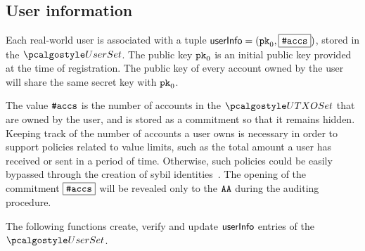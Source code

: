 \subsection{User information}
Each real-world user is associated with a tuple $\userinfo=(\inpk,\comm{\numaccs})$, stored in the $\usersset$.
The public key $\inpk$ is an initial public key provided at the time of registration. 
The public key of every account owned by the user will share the same secret key with $\inpk$.

The value $\numaccs$ is the number of accounts in the $\utxoset$ that are owned by the user, and is stored as a commitment so that it remains hidden. 
Keeping track of the number of accounts a user owns is necessary in order to support  policies related to value limits, such as the total amount a user has received or sent in a period of time. Otherwise, such policies could be easily bypassed through the creation of sybil identities~\cite{SokAuditability}.
 The opening of the commitment $\comm{\numaccs}$ will be revealed only to the $\AA$ during the auditing procedure.

The following functions create, verify and update $\userinfo$ entries of the $\usersset$.

